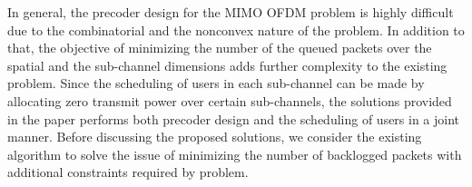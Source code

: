 

In general, the precoder design for the \ac{MIMO} \ac{OFDM} problem is highly difficult due to the combinatorial and the nonconvex nature of the problem. In addition to that, the objective of minimizing the number of the queued packets over the spatial and the sub-channel dimensions adds further complexity to the existing problem. Since the scheduling of users in each sub-channel can be made by allocating zero transmit power over certain sub-channels, the solutions provided in the paper performs both precoder design and the scheduling of users in a joint manner. Before discussing the proposed solutions, we consider the existing algorithm to solve the issue of minimizing the number of backlogged packets with additional constraints required by problem.